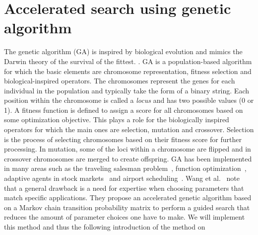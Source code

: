 \section{Accelerated search using genetic algorithm}\label{sec:GA}
The genetic algorithm (\acrshort{GA}) is inspired by biological evolution and mimics the Darwin theory of the survival of the fittest.
\cite{katoch_review_2021}. \acrshort{GA} is a population-based algorithm for
which the basic elements are chromosome representation, fitness selection and
biological-inspired operators. The chromosomes represent the genes for each
individual in the population and typically take the form of a binary string.
Each position within the chromosome is called a \textit{locus} and has two
possible values (0 or 1). A fitness function is defined to assign a score for
all chromosomes based on some optimization objective. This plays a role for the
biologically inspired operators for which the main ones are selection, mutation
and crossover. Selection is the process of selecting chromosomes based on their
fitness score for further processing. In mutation, some of the loci within a
chromosome are flipped and in crossover chromosomes are merged to create
offspring. \acrshort{GA} has been implemented in many areas such as the traveling salesman problem~\cite{jiang2000distributed}, function optimization~\cite{szeto1998effects}, adaptive agents in stock markets~\cite{szeto2000adaptive} and airport scheduling~\cite{shiu2008self}. Wang et al.~\cite{Wang2010} note that a general drawback is a need for expertise when choosing parameters that match specific applications. They propose an accelerated genetic algorithm based on a Markov chain transition probability matrix to perform a guided search that reduces the amount of parameter choices one have to make. We will implement this method and thus the following introduction of the method on~\cite{Wang2010}

